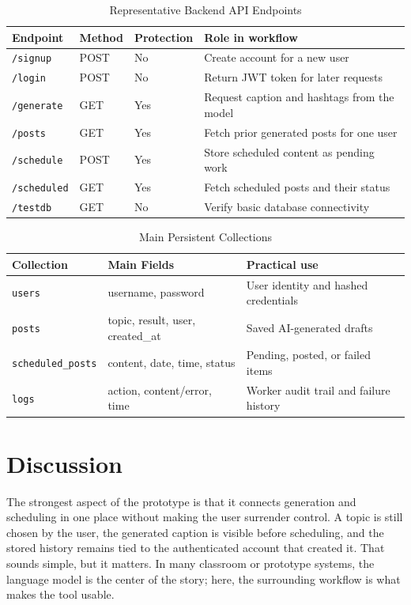 \documentclass[conference]{IEEEtran}
\begin{document}
\begin{table}[!t]
\caption{Representative Backend API Endpoints}
\label{tab:api}
\centering
\scriptsize
\begin{tabular}{llll}
\toprule
Endpoint & Method & Protection & Role in workflow\\
\midrule
\texttt{/signup} & POST & No & Create account for a new user\\
\texttt{/login} & POST & No & Return JWT token for later requests\\
\texttt{/generate} & GET & Yes & Request caption and hashtags from the model\\
\texttt{/posts} & GET & Yes & Fetch prior generated posts for one user\\
\texttt{/schedule} & POST & Yes & Store scheduled content as pending work\\
\texttt{/scheduled} & GET & Yes & Fetch scheduled posts and their status\\
\texttt{/testdb} & GET & No & Verify basic database connectivity\\
\bottomrule
\end{tabular}
\end{table}

\begin{table}[!t]
\caption{Main Persistent Collections}
\label{tab:collections}
\centering
\scriptsize
\begin{tabular}{lll}
\toprule
Collection & Main Fields & Practical use\\
\midrule
\texttt{users} & username, password & User identity and hashed credentials\\
\texttt{posts} & topic, result, user, created\_at & Saved AI-generated drafts\\
\texttt{scheduled\_posts} & content, date, time, status & Pending, posted, or failed items\\
\texttt{logs} & action, content/error, time & Worker audit trail and failure history\\
\bottomrule
\end{tabular}
\end{table}

\section{Discussion}

The strongest aspect of the prototype is that it connects generation and scheduling in one place without making the user surrender control. A topic is still chosen by the user, the generated caption is visible before scheduling, and the stored history remains tied to the authenticated account that created it. That sounds simple, but it matters. In many classroom or prototype systems, the language model is the center of the story; here, the surrounding workflow is what makes the tool usable.
\end{document}
